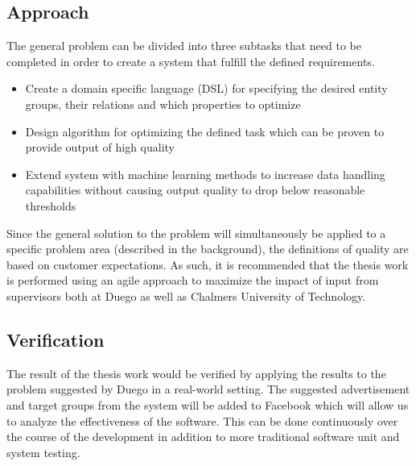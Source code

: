 \documentclass[a4paper]{article}
\begin{document}
\subsection{Approach}
\label{sec:approach}
The general problem can be divided into three subtasks that need to be completed in order to create a system that fulfill the defined requirements.
\begin{itemize}
	\item Create a domain specific language (DSL) for specifying the desired entity groups, their relations and which properties to optimize
	\item Design algorithm for optimizing the defined task which can be proven to provide output of high quality 
	\item Extend system with machine learning methods to increase data handling capabilities without causing output quality to drop below reasonable thresholds
\end{itemize}
Since the general solution to the problem will simultaneously be applied to a specific problem area (described in the background), the definitions of quality are based on customer expectations. As such, it is recommended that the thesis work is performed using an agile approach to maximize the impact of input from supervisors both at Duego as well as Chalmers University of Technology.

\subsection{Verification}
The result of the thesis work would be verified by applying the results to the problem suggested by Duego in a real-world setting. The suggested advertisement and target groups from the system will be added to Facebook which will allow us to analyze the effectiveness of the software. This can be done continuously over the course of the development in addition to more traditional software unit and system testing.


\end{document}
